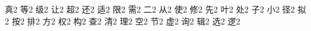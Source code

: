 {{真}{{}}{2}
{等}{{}}{2}
{级}{{}}{2}
{让}{{}}{2}
{超}{{}}{2}
{还}{{}}{2}
{适}{{}}{2}
{限}{{}}{2}
{需}{{}}{2}
{二}{{}}{2}
{从}{{}}{2}
{使}{{}}{2}
{修}{{}}{2}
{先}{{}}{2}
{叶}{{}}{2}
{处}{{}}{2}
{子}{{}}{2}
{小}{{}}{2}
{径}{{}}{2}
{拟}{{}}{2}
{按}{{}}{2}
{排}{{}}{2}
{方}{{}}{2}
{权}{{}}{2}
{构}{{}}{2}
{查}{{}}{2}
{清}{{}}{2}
{理}{{}}{2}
{空}{{}}{2}
{节}{{}}{2}
{虚}{{}}{2}
{询}{{}}{2}
{辑}{{}}{2}
{选}{{}}{2}
{逻}{{}}{2}
}
